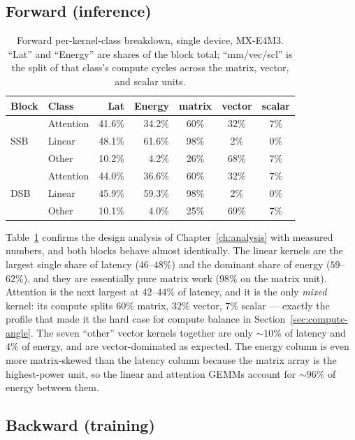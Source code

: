 \documentclass[11pt]{report}
\begin{document}
\subsection{Forward (inference)}

\begin{table}[h]
\centering
\caption{Forward per-kernel-class breakdown, single device, MX-E4M3. ``Lat''
and ``Energy'' are shares of the block total; ``mm/vec/scl'' is the split of
that class's compute cycles across the matrix, vector, and scalar units.}
\label{tab:local-fwd}
\begin{tabular}{@{}llrrccc@{}}
\toprule
Block & Class & Lat & Energy & matrix & vector & scalar \\
\midrule
\multirow{3}{*}{SSB} & Attention & 41.6\% & 34.2\% & 60\% & 32\% & 7\% \\
 & Linear & 48.1\% & 61.6\% & 98\% & 2\% & 0\% \\
 & Other & 10.2\% & 4.2\% & 26\% & 68\% & 7\% \\
\midrule
\multirow{3}{*}{DSB} & Attention & 44.0\% & 36.6\% & 60\% & 32\% & 7\% \\
 & Linear & 45.9\% & 59.3\% & 98\% & 2\% & 0\% \\
 & Other & 10.1\% & 4.0\% & 25\% & 69\% & 7\% \\
\bottomrule
\end{tabular}
\end{table}

Table~\ref{tab:local-fwd} confirms the design analysis of
Chapter~\ref{ch:analysis} with measured numbers, and both blocks behave
almost identically. The linear kernels are the largest single share of
latency ($46$--$48\%$) and the dominant share of energy ($59$--$62\%$), and
they are essentially pure matrix work ($98\%$ on the matrix unit). Attention
is the next largest at $42$--$44\%$ of latency, and it is the only
\emph{mixed} kernel: its compute splits $60\%$ matrix, $32\%$ vector,
$7\%$ scalar --- exactly the profile that made it the hard case for compute
balance in Section~\ref{sec:compute-angle}. The seven ``other'' vector
kernels together are only ${\sim}10\%$ of latency and $4\%$ of energy, and
are vector-dominated as expected. The energy column is even more
matrix-skewed than the latency column because the matrix array is the
highest-power unit, so the linear and attention GEMMs account for
${\sim}96\%$ of energy between them.

\subsection{Backward (training)}
\end{document}
